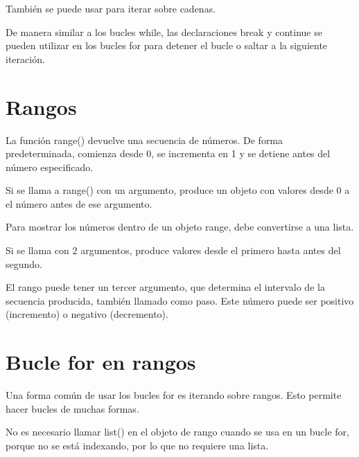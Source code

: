 \documentclass{report}
\begin{document}

También se puede usar para iterar sobre cadenas.


De manera similar a los bucles while, las declaraciones break y continue se pueden utilizar en los bucles for para detener el bucle o saltar a la siguiente iteración.


\section{Rangos}

La función range() devuelve una secuencia de números. De forma predeterminada, comienza desde 0, se incrementa en 1 y se detiene antes del número especificado.

Si se llama a range() con un argumento, produce un objeto con valores desde 0 a el número antes de ese argumento.


Para mostrar los números dentro de un objeto range, debe convertirse a una lista.

Si se llama con 2 argumentos, produce valores desde el primero hasta antes del segundo.



El rango puede tener un tercer argumento, que determina el intervalo de la secuencia producida, también llamado como paso. Este número puede ser positivo (incremento) o negativo (decremento).


\section{Bucle for en rangos}

Una forma común de usar los bucles for es iterando sobre rangos. Esto permite hacer bucles de muchas formas.


No es necesario llamar list() en el objeto de rango cuando se usa en un bucle for, porque no se está indexando, por lo que no requiere una lista.

\end{document}
